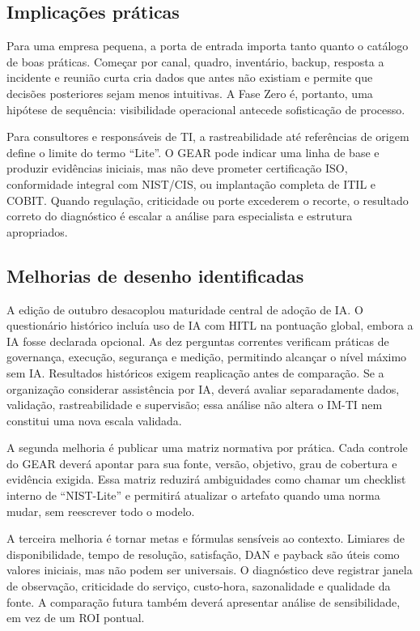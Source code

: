 \subsection{Implicações práticas}

Para uma empresa pequena, a porta de entrada importa tanto quanto o catálogo de boas práticas. Começar por canal, quadro, inventário, backup, resposta a incidente e reunião curta cria dados que antes não existiam e permite que decisões posteriores sejam menos intuitivas. A Fase Zero é, portanto, uma hipótese de sequência: visibilidade operacional antecede sofisticação de processo.

Para consultores e responsáveis de TI, a rastreabilidade até referências de origem define o limite do termo ``Lite''. O GEAR pode indicar uma linha de base e produzir evidências iniciais, mas não deve prometer certificação ISO, conformidade integral com NIST/CIS, ou implantação completa de ITIL e COBIT. Quando regulação, criticidade ou porte excederem o recorte, o resultado correto do diagnóstico é escalar a análise para especialista e estrutura apropriados.

\subsection{Melhorias de desenho identificadas}

A edição de outubro desacoplou maturidade central de adoção de IA. O questionário histórico incluía uso de IA com HITL na pontuação global, embora a IA fosse declarada opcional. As dez perguntas correntes verificam práticas de governança, execução, segurança e medição, permitindo alcançar o nível máximo sem IA. Resultados históricos exigem reaplicação antes de comparação. Se a organização considerar assistência por IA, deverá avaliar separadamente dados, validação, rastreabilidade e supervisão; essa análise não altera o IM-TI nem constitui uma nova escala validada.

A segunda melhoria é publicar uma matriz normativa por prática. Cada controle do GEAR deverá apontar para sua fonte, versão, objetivo, grau de cobertura e evidência exigida. Essa matriz reduzirá ambiguidades como chamar um checklist interno de ``NIST-Lite'' e permitirá atualizar o artefato quando uma norma mudar, sem reescrever todo o modelo.

A terceira melhoria é tornar metas e fórmulas sensíveis ao contexto. Limiares de disponibilidade, tempo de resolução, satisfação, DAN e payback são úteis como valores iniciais, mas não podem ser universais. O diagnóstico deve registrar janela de observação, criticidade do serviço, custo-hora, sazonalidade e qualidade da fonte. A comparação futura também deverá apresentar análise de sensibilidade, em vez de um ROI pontual.

